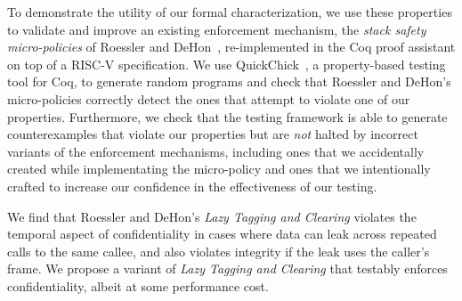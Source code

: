 To demonstrate the utility of our formal characterization, we use these
properties to validate and improve an existing enforcement mechanism, the
{\em stack safety micro-policies} of Roessler and DeHon~\cite{DBLP:conf/sp/RoesslerD18}, re-implemented
in the Coq proof assistant on top of a  RISC-V specification.  We
use QuickChick~\cite{Denes:VSL2014,Pierce:SF4}, a property-based testing
tool for Coq, to generate random programs and check
that Roessler and DeHon's micro-policies correctly detect the ones that
attempt to violate one of our properties. Furthermore, we
check that the testing framework is able to generate counterexamples
that violate our properties but are \emph{not} halted by incorrect
variants of the enforcement mechanisms, including ones that we accidentally created
while implementating the micro-policy and ones that we
intentionally crafted to increase our confidence in the effectiveness
of our testing.
%

We find that Roessler and DeHon's \emph{Lazy Tagging and Clearing}
violates the temporal aspect of confidentiality in
cases where data can leak across repeated calls to the same callee,
and also violates integrity if the leak uses the caller's frame. We
propose a variant of {\em Lazy Tagging and Clearing} that testably enforces
confidentiality, albeit at some performance cost.
%

